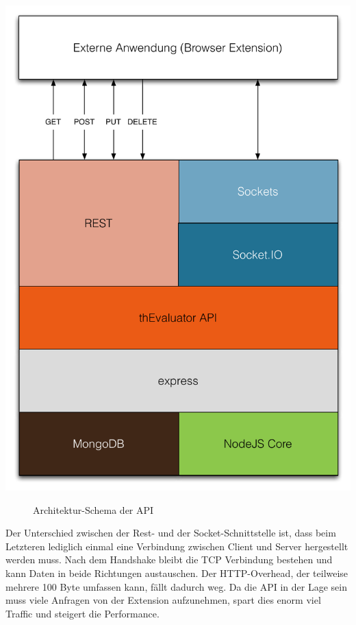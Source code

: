 \begin{center}
\includegraphics[scale=0.49]{./images/api-architecture}
\end{center}
\begin{figure}[htb]
   \centering
   \caption{Architektur-Schema der API}
    \label{api}
\end{figure}

Der Unterschied zwischen der Rest- und der Socket-Schnittstelle ist, dass beim Letzteren lediglich einmal eine Verbindung zwischen Client und Server hergestellt werden muss. Nach dem Handshake bleibt die TCP Verbindung bestehen und kann Daten in beide Richtungen austauschen. Der HTTP-\Gls{Overhead}, der teilweise mehrere 100 Byte umfassen kann, fällt dadurch weg. Da die API in der Lage sein muss viele Anfragen von der Extension aufzunehmen, spart dies enorm viel Traffic und steigert die Performance.

